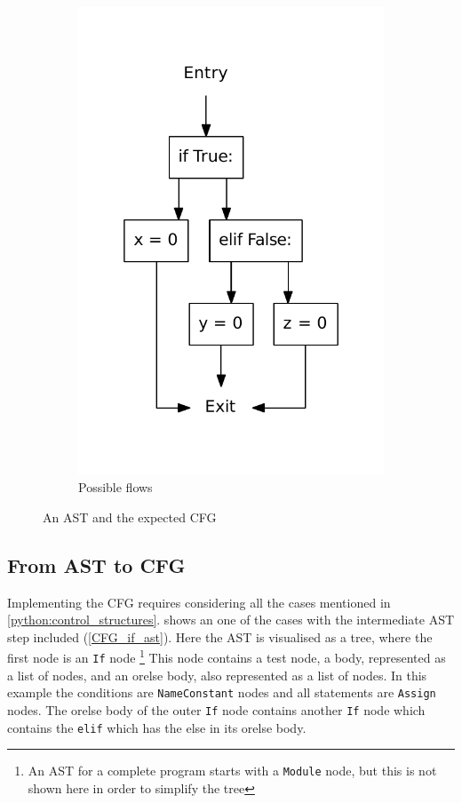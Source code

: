 \begin{figure}[H]
\begin{subfigure}[b]{0.3\textwidth}
    \includegraphics[scale=.5]{./figures/if_else_elif.pdf}
    \caption{Possible flows}
    \label{CFG_if_flow}
  \end{subfigure}

  \caption{An AST and the expected CFG}
  \label{CFG_if_else}  
\end{figure}

\subsection{From AST to CFG}
Implementing the CFG requires considering all the cases mentioned in \cref{python:control_structures}.
 shows an one of the cases with the intermediate AST step included (\cref{CFG_if_ast}).
Here the AST is visualised as a tree, where the first node is an \texttt{If} node \footnote{An AST for a complete program starts with a \texttt{Module} node, but this is not shown here in order to simplify the tree}
This node contains a test node, a body, represented as a list of nodes, and an orelse body, also represented as a list of nodes.
In this example the conditions are \texttt{NameConstant} nodes and all statements are \texttt{Assign} nodes.
The orelse body of the outer \texttt{If} node contains another \texttt{If} node which contains the \texttt{elif} which has the else in its orelse body.

